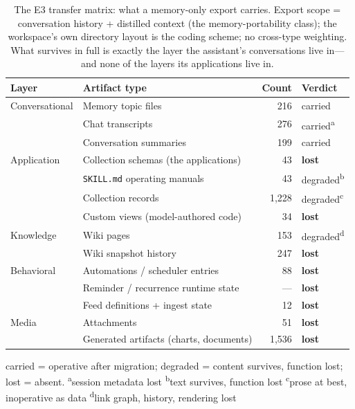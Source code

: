 \documentclass[11pt]{article}
\newcommand{\code}[1]{\texttt{\small #1}}
\begin{document}
\begin{table}[t]
\vspace*{1.2em}
\centering
\caption{The E3 transfer matrix: what a memory-only export carries. Export scope
= conversation history + distilled context (the memory-portability class); the
workspace's own directory layout is the coding scheme; no cross-type weighting.
What survives in full is exactly the layer the assistant's conversations live
in---and none of the layers its applications live in.}
\label{tab:transfer}
\small
\begin{tabular}{@{}llrl@{}}
\toprule
\textbf{Layer} & \textbf{Artifact type} & \textbf{Count} & \textbf{Verdict} \\
\midrule
Conversational & Memory topic files & 216 & carried \\
 & Chat transcripts & 276 & carried\textsuperscript{a} \\
 & Conversation summaries & 199 & carried \\
\midrule
Application & Collection schemas (the applications) & 43 & \textbf{lost} \\
 & \code{SKILL.md} operating manuals & 43 & degraded\textsuperscript{b} \\
 & Collection records & 1,228 & degraded\textsuperscript{c} \\
 & Custom views (model-authored code) & 34 & \textbf{lost} \\
\midrule
Knowledge & Wiki pages & 153 & degraded\textsuperscript{d} \\
 & Wiki snapshot history & 247 & \textbf{lost} \\
\midrule
Behavioral & Automations / scheduler entries & 88 & \textbf{lost} \\
 & Reminder / recurrence runtime state & --- & \textbf{lost} \\
 & Feed definitions + ingest state & 12 & \textbf{lost} \\
\midrule
Media & Attachments & 51 & \textbf{lost} \\
 & Generated artifacts (charts, documents) & 1,536 & \textbf{lost} \\
\bottomrule
\end{tabular}

\vspace{2pt}
{\footnotesize carried = operative after migration; degraded = content survives,
function lost; lost = absent.
\textsuperscript{a}session metadata lost \enspace
\textsuperscript{b}text survives, function lost \enspace
\textsuperscript{c}prose at best, inoperative as data \enspace
\textsuperscript{d}link graph, history, rendering lost}
\end{table}
\end{document}
